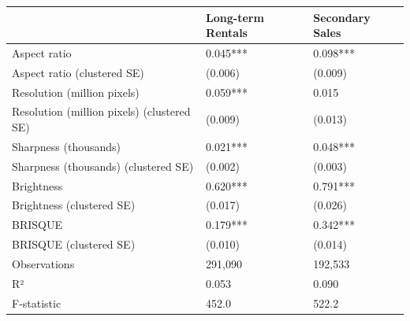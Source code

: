 \begin{tabular}{lll}
\toprule
 & Long-term Rentals & Secondary Sales \\
\midrule
Aspect ratio & 0.045*** & 0.098*** \\
Aspect ratio (clustered SE) & (0.006) & (0.009) \\
Resolution (million pixels) & 0.059*** & 0.015 \\
Resolution (million pixels) (clustered SE) & (0.009) & (0.013) \\
Sharpness (thousands) & 0.021*** & 0.048*** \\
Sharpness (thousands) (clustered SE) & (0.002) & (0.003) \\
Brightness & 0.620*** & 0.791*** \\
Brightness (clustered SE) & (0.017) & (0.026) \\
BRISQUE & 0.179*** & 0.342*** \\
BRISQUE (clustered SE) & (0.010) & (0.014) \\
Observations & 291,090 & 192,533 \\
R² & 0.053 & 0.090 \\
F-statistic & 452.0 & 522.2 \\
\bottomrule
\end{tabular}
